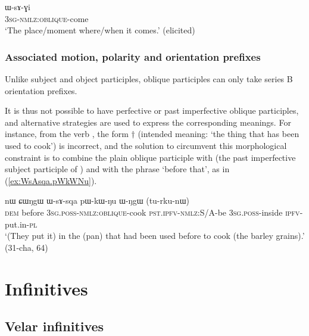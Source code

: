    \begin{exe}
\ex \label{ex:come}
\gll ɯ-sɤ-ɣi    \\
   \textsc{3sg-nmlz:oblique}-come \\
 \glt  `The place/moment where/when it comes.' (elicited)
 \end{exe}
 
 
\subsubsection{Associated motion, polarity and orientation prefixes} \label{sec:onlique.participle.orientation}
Unlike subject and object participles, oblique participles can only take series B orientation prefixes. 

It is thus not possible to have perfective or past imperfective oblique participles, and alternative strategies are used to express the corresponding meanings. For instance, from the verb , the form $\dagger$ (intended meaning: `the thing that has been used to cook') is incorrect, and the solution to circumvent this morphological constraint is to combine the plain oblique participle  with  (the past imperfective subject participle of ) and with the phrase  `before that', as in (\ref{ex:WsAsqa.pWkWNu}).

\begin{exe}
\ex \label{ex:WsAsqa.pWkWNu}
\gll  nɯ ɕɯŋgɯ ɯ-sɤ-sqa pɯ-kɯ-ŋu ɯ-ŋgɯ (tu-rku-nɯ) \\
\textsc{dem} before \textsc{3sg}.\textsc{poss}-\textsc{nmlz}:\textsc{oblique}-cook \textsc{pst}.\textsc{ipfv}-\textsc{nmlz}:S/A-be \textsc{3sg}.\textsc{poss}-inside \textsc{ipfv}-put.in-\textsc{pl} \\
\glt `(They put it) in the (pan) that had been used before to cook (the barley grains).' (31-cha, 64)
\end{exe}


\section{Infinitives}

\subsection{Velar infinitives} \label{sec:velar.inf}


